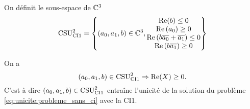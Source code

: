 
    \begin{defn}
      \label{def:csu:ci1-2}

      On définit le sous-espace de \(\CC^3\)
      \begin{equation*}
        \CSU[2]{CI1} = \left\lbrace
        (a_0,a_1,b) \in \CC^3,
        \begin{matrix}
        \Re(b) \le 0
        \\
        \Re\left(a_0\right) \ge 0
        \\
        \Re\left(b\conj{a_0}+\conj{a_1}\right) \le 0
        \\
        \Re\left(b\conj{a_1}\right) \ge 0
        \end{matrix}
        \right\rbrace
      \end{equation*}
    \end{defn}

    \begin{prop}
      \label{prop:csu:ci1-2}
      On a 
      \begin{equation*}
        (a_0,a_1,b) \in \CSU[2]{CI1} \Rightarrow \Re(X)\ge 0. 
      \end{equation*}
      C'est à dire \((a_0,a_1,b) \in \CSU[2]{CI1}\) entraîne l'unicité de la solution du problème \eqref{eq:unicite:probleme_sans_ci} avec la CI1.
    \end{prop}

